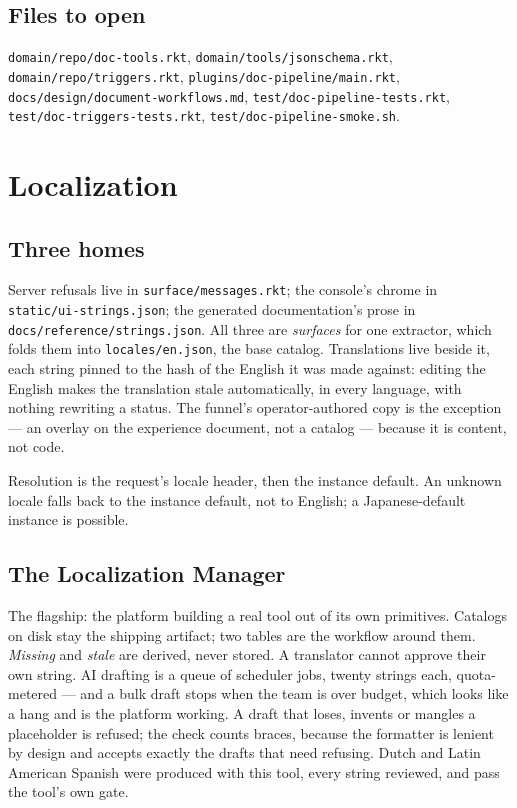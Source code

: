 \documentclass[11pt,a4paper]{report}
\gdef\currentchapterart{art/telemachus-head.png}
\newcommand{\chapterart}[1]{\gdef\currentchapterart{#1}}
\newcommand{\chapterart}[1]{}
\begin{document}
\section{Files to open}

\texttt{domain/repo/doc-tools.rkt}, \texttt{domain/tools/jsonschema.rkt}, \texttt{domain/repo/triggers.rkt}, \texttt{plugins/doc-pipeline/main.rkt}, \texttt{docs/design/document-workflows.md}, \texttt{test/doc-pipeline-tests.rkt}, \texttt{test/doc-triggers-tests.rkt}, \texttt{test/doc-pipeline-smoke.sh}.

\chapterart{art/ch-10-l10n.png}
\chapter{Localization}

\section{Three homes}

Server refusals live in \texttt{surface/messages.rkt}; the console's chrome in \texttt{static/ui-strings.json}; the generated documentation's prose in \texttt{docs/reference/strings.json}. All three are \emph{surfaces} for one extractor, which folds them into \texttt{locales/en.json}, the base catalog. Translations live beside it, each string pinned to the hash of the English it was made against: editing the English makes the translation stale automatically, in every language, with nothing rewriting a status. The funnel's operator-authored copy is the exception --- an overlay on the experience document, not a catalog --- because it is content, not code.

Resolution is the request's locale header, then the instance default. An unknown locale falls back to the instance default, not to English; a Japanese-default instance is possible.

\section{The Localization Manager}

The flagship: the platform building a real tool out of its own primitives. Catalogs on disk stay the shipping artifact; two tables are the workflow around them. \emph{Missing} and \emph{stale} are derived, never stored. A translator cannot approve their own string. AI drafting is a queue of scheduler jobs, twenty strings each, quota-metered --- and a bulk draft stops when the team is over budget, which looks like a hang and is the platform working. A draft that loses, invents or mangles a placeholder is refused; the check counts braces, because the formatter is lenient by design and accepts exactly the drafts that need refusing. Dutch and Latin American Spanish were produced with this tool, every string reviewed, and pass the tool's own gate.
\end{document}
